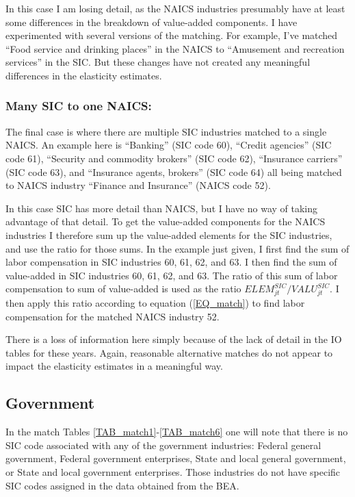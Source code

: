 \documentclass[11pt]{article}
\begin{document}
In this case I am losing detail, as the NAICS industries presumably have at least some differences in the breakdown of value-added components. I have experimented with several versions of the matching. For example, I've matched ``Food service and drinking places'' in the NAICS to ``Amusement and recreation services'' in the SIC. But these changes have not created any meaningful differences in the elasticity estimates.

\subsubsection{Many SIC to one NAICS:} The final case is where there are multiple SIC industries matched to a single NAICS. An example here is ``Banking'' (SIC code 60), ``Credit agencies'' (SIC code 61), ``Security and commodity brokers'' (SIC code 62), ``Insurance carriers'' (SIC code 63), and ``Insurance agents, brokers'' (SIC code 64) all being matched to NAICS industry ``Finance and Insurance'' (NAICS code 52). 

In this case SIC has more detail than NAICS, but I have no way of taking advantage of that detail. To get the value-added components for the NAICS industries I therefore sum up the value-added elements for the SIC industries, and use the ratio for those sums. In the example just given, I first find the sum of labor compensation in SIC industries 60, 61, 62, and 63. I then find the sum of value-added in SIC industries 60, 61, 62, and 63. The ratio of this sum of labor compensation to sum of value-added is used as the ratio $ELEM_{jt}^{SIC}/VALU_{jt}^{SIC}$. I then apply this ratio according to equation (\ref{EQ_match}) to find labor compensation for the matched NAICS industry 52. 

There is a loss of information here simply because of the lack of detail in the IO tables for these years. Again, reasonable alternative matches do not appear to impact the elasticity estimates in a meaningful way.

\subsection{Government}
In the match Tables \ref{TAB_match1}-\ref{TAB_match6} one will note that there is no SIC code associated with any of the government industries: Federal general government, Federal government enterprises, State and local general government, or State and local government enterprises. Those industries do not have specific SIC codes assigned in the data obtained from the BEA. 
\end{document}
